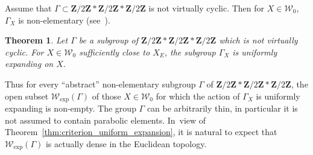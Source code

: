\documentclass[JEP,XML,SOM,Unicode,published]{cedram}
\def\Z{\mathbf{Z}}
\newcommand{\cW}{\mathcal{W}}
\theoremstyle{plain}
\newtheorem{thm}{Theorem}[section]
\theoremstyle{definition}
\begin{document}
Assume that $\Gamma\subset \Z/2\Z\ast\Z/2\Z\ast\Z/2\Z$ is not virtually cyclic. Then for $X\in \cW_0$, $\Gamma_X$ is non-elementary (see~\cite[\S 3]{stiffness}).

\begin{thm}\label{thm:thin}
Let $\Gamma$ be a subgroup of $\Z/2\Z\ast\Z/2\Z\ast\Z/2\Z$ which is not virtually cyclic.
For $X\in \cW_0$ sufficiently close to $X_E$, the subgroup $\Gamma_X$ is uniformly expanding on $X$.
\end{thm}

Thus for every ``abstract'' non-elementary subgroup $\Gamma$ of $\Z/2\Z\ast\Z/2\Z\ast\Z/2\Z$, the open
subset $\cW_{\exp}(\Gamma)$ of those $X\in \cW_0$ for which the action of $\Gamma_X$ is uniformly expanding is non-empty.
The group $\Gamma$ can be arbitrarily thin, in particular it is not assumed to contain parabolic elements. In~view of Theorem~\ref{thm:criterion_uniform_expansion}, it is natural to expect that $\cW_{\exp}(\Gamma)$ is actually dense in the Euclidean topology.
\end{document}
